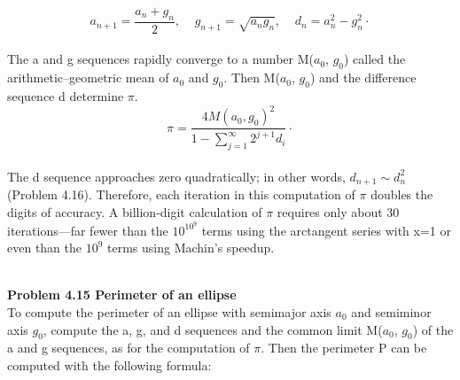 \documentclass{book}
\newcounter{pro1}
\begin{document}
\begin {equation}\label{formula4.23}
a_{n+1}=\frac{a_{n}+g_{n}}{2}{,}\;\;\;\;g_{n+1}=\sqrt{a_{n}g_{n}}{,}\;\;\;\;d_{n}=a_n^2-g_n^2\cdot
\end{equation}
\\
\noindent\Large \textrm{The a and g sequences rapidly converge to a number M($a_{0}$, $g_{0}$) called the arithmetic–geometric mean of $a_{0}$ and $g_{0}$. Then M($a_{0}$, $g_{0}$) and the difference sequence d determine $\pi$.}
\begin {equation}\label{formula4.24}
\pi=\frac{4M(a_{0},g_{0})^{2}}{1-\sum_{j=1}^\infty 2^{j+1}d_{i}}\cdot
\end{equation}
\\
\noindent\Large \textrm{ The d sequence approaches zero quadratically; in other words, $d_{n+1}\sim d_n^2$ (Problem 4.16). Therefore, each iteration in this computation of $\pi$ doubles the digits of accuracy. A billion-digit calculation of $\pi$ requires only about
30 iterations—far fewer than the $10^{10^{9}}$ terms using the arctangent series
with x=1 or even than the $10^{9}$ terms using Machin’s speedup.} \\
\\
\colorbox{light-gray}{
\begin{minipage}{\textwidth}
\Large \textrm{\textbf{Problem 4.15 \;  Perimeter of an ellipse}\\
To compute the perimeter of an ellipse with semimajor axis $a_{0}$ and semiminor
axis $g_{0}$, compute the a, g, and d sequences and the common limit M($a_{0}$, $g_{0}$) of
the a and g sequences, as for the computation of $\pi$. Then the perimeter P can
be computed with the following formula:}\\
\end{minipage}}
\newpage
\pagestyle{fancy} 

\renewcommand{\headrulewidth}{0pt} 
\fancyhf{}
\end{document}
